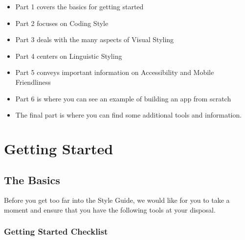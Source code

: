 \documentclass[
]{book}
\providecommand{\tightlist}{%
  \setlength{\itemsep}{0pt}\setlength{\parskip}{0pt}}
\begin{document}
\begin{itemize}
\tightlist
\item
  Part 1 covers the basics for getting started
\item
  Part 2 focuses on Coding Style
\item
  Part 3 deals with the many aspects of Visual Styling
\item
  Part 4 centers on Linguistic Styling
\item
  Part 5 conveys important information on Accessibility and Mobile Friendliness
\item
  Part 6 is where you can see an example of building an app from scratch
\item
  The final part is where you can find some additional tools and information.
\end{itemize}

\hypertarget{part-getting-started}{%
\part{Getting Started}\label{part-getting-started}}

\setcounter{chapter}{0}

\hypertarget{basics}{%
\chapter{The Basics}\label{basics}}

Before you get too far into the Style Guide, we would like for you to take a moment and ensure that you have the following tools at your disposal.

\hypertarget{checklist}{%
\section{Getting Started Checklist}\label{checklist}}
\end{document}
